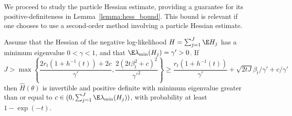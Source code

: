 We proceed to study the particle Hessian estimate, providing a guarantee for its positive-definiteness in Lemma~\ref{lemma:hess_bound}.
This bound is relevant if one chooses to use a second-order method involving a particle Hessian estimate.

\begin{lem}
    \label{lemma:hess_bound}
    Assume that the Hessian of the negative log-likelihood $H=\sum_{j=1}^J \E H_j$ has a minimum eigenvalue $0<\gamma<1$, and that $\E \lambda_{\min} (H_j) = \gamma' > 0$. 
    If 
    \begin{equation}
        J > \max\left\{\frac{2r_t(1+h^{-1}(t)) + 2c}{\gamma'}, \frac{2(2t\beta_t^2+c)^2}{\gamma'^2}\right\} \geq  \frac{r_t(1+h^{-1}(t))}{\gamma'} + \sqrt{2tJ}\beta_t/\gamma' + c/\gamma'
    \end{equation}    
    then $\hat{H}(\theta)$ is invertible and positive definite with minimum eigenvalue greater than or equal to $c \in (0, \sum_{j=1}^J \E\lambda_{\min}(H_j))$, with probability at least $1-\exp(-t)$.
\end{lem}
